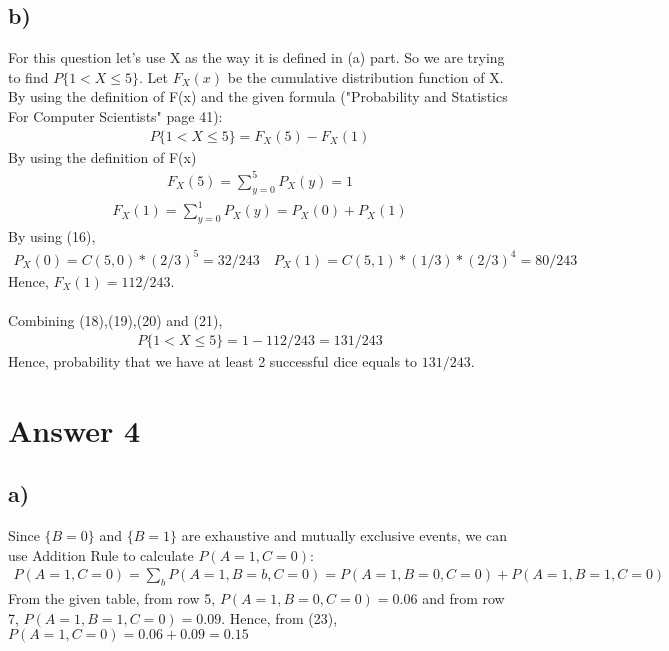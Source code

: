 \documentclass[12pt]{article}
\begin{document}
\subsection*{b)} For this question let's use X as the way it is defined in (a) part. So we are trying to find $P\{1<X\leq 5\}$. Let $F_{X}(x)$ be the cumulative distribution function of X. By using the definition of F(x) and the given formula ("Probability and Statistics For Computer Scientists" page 41): 
\begin{equation} 
\begin{split}
P\{1<X\leq 5\} = F_{X}(5) - F_{X}(1)
\end{split}
\end{equation}
By using the definition of F(x)
\begin{equation} 
\begin{split}
F_{X}(5) = \sum_{y=0}^{5} P_{X}(y) = 1
\end{split}
\end{equation}
\begin{equation} 
\begin{split}
F_{X}(1) = \sum_{y=0}^{1} P_{X}(y) = P_{X}(0) + P_{X}(1)
\end{split}
\end{equation}
By using (16),
\begin{equation} 
\begin{split}
P_{X}(0) = C(5,0)*(2/3)^5 = 32/243 \quad P_{X}(1) = C(5,1)*(1/3)*(2/3)^4 = 80/243
\end{split}
\end{equation}
Hence, $F_{X}(1) = 112/243$. \\ \\
Combining (18),(19),(20) and (21),
\begin{equation} 
\begin{split}
P\{1<X\leq 5\} = 1-112/243 = 131/243
\end{split}
\end{equation}
Hence, probability that we have at least 2 successful dice equals to $131/243$.

\section*{Answer 4}
\subsection*{a)} Since $\{B=0\}$ and $\{B=1\}$ are exhaustive and mutually exclusive events, we can use Addition Rule to calculate $P(A=1,C=0)$:
\begin{equation} 
	\begin{split}
		P(A=1,C=0) = \sum_{b}P(A=1,B=b,C=0) = P(A=1,B=0,C=0)+P(A=1,B=1,C=0)
	\end{split}
\end{equation}
From the given table, from row 5, $P(A=1,B=0,C=0)=0.06$ and from row 7, $P(A=1,B=1,C=0)=0.09$. Hence, from (23),
$P(A=1,C=0) = 0.06 + 0.09 = 0.15$
\end{document}
